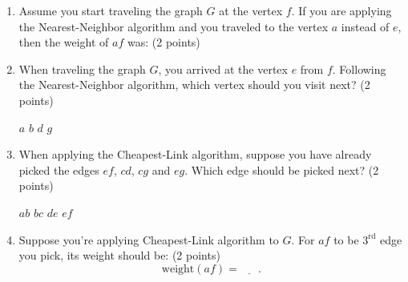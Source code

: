 \documentclass[12pt]{exam}
\begin{document}
\begin{enumerate}
\begin{enumerate}
\begin{figure}[h]
        
    \end{figure}
    \vfill 
    \item Assume you start traveling the graph $G$ at the vertex $f$. If you are applying the Nearest-Neighbor algorithm and you traveled to the vertex $a$ instead of $e$, then the weight of $af$ was: (2 points)
    \begin{checkboxes}
    \end{checkboxes}
    \vfill
    \item When traveling the graph $G$, you arrived at the vertex $e$ from $f$. Following the Nearest-Neighbor algorithm, which vertex should you visit next? (2 points)
    \begin{checkboxes}
        \choice $a$
        \choice $b$
        \choice $d$
        \choice $g$
    \end{checkboxes}
    \vfill
    \item When applying the Cheapest-Link algorithm, suppose you have already picked the edges $ef$, $cd$, $cg$ and $eg$. Which edge should be picked next? (2 points)
    \begin{checkboxes}
        \choice $ab$
        \choice $bc$
        \choice $de$
        \choice $ef$
    \end{checkboxes}
    \vfill
    \item \label{lastQnSec1} Suppose you're applying Cheapest-Link algorithm to $G$. For $af$ to be $3^{\text{rd}}$ edge you pick, its weight should be: (2 points)
    \vspace{0.5em}
    $$\text{weight}(af)=\underline{\phantom{ans}}.$$
    \vfill
\end{enumerate}

\end{enumerate}
\end{document}
